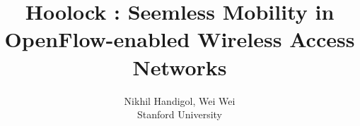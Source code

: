 \documentclass[times, conference, 10pt,twocolumn]{IEEEtran}
\begin{document}
\title{Hoolock : Seemless Mobility in OpenFlow-enabled Wireless Access Networks}

\author{Nikhil Handigol, Wei Wei\\
Stanford University\\
}

\maketitle
\thispagestyle{empty}








%


\end{document}
